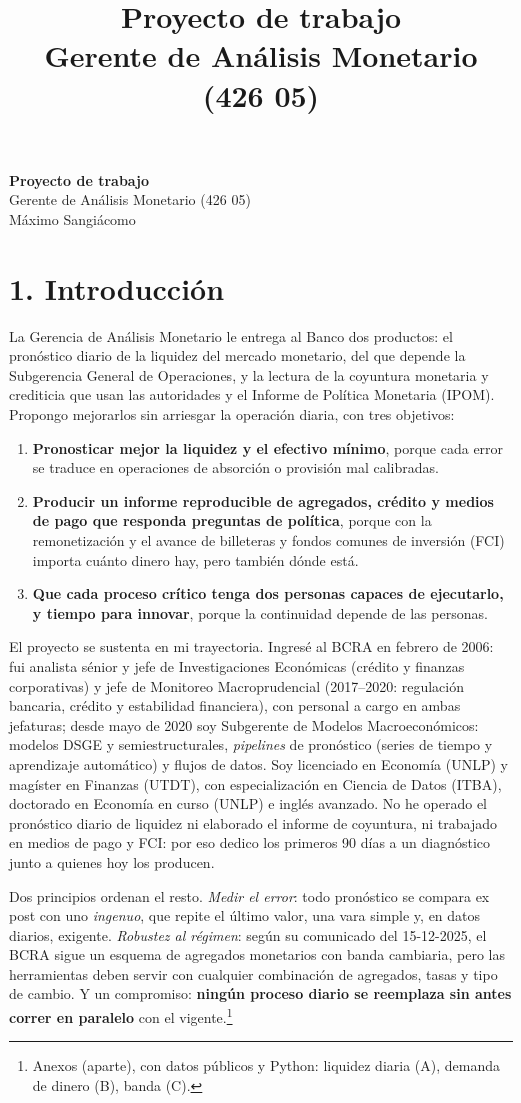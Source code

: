 \documentclass[11pt,a4paper]{article}
\title{\textbf{Proyecto de trabajo}\\[2pt]\large Gerente de Análisis Monetario (426 05)}
\author{\autor}
\date{}
\newcommand{\autor}{Máximo Sangiácomo}
\newcommand{\trayectoria}{Ingresé al BCRA en febrero de 2006: fui analista sénior y jefe de Investigaciones Económicas (crédito y finanzas corporativas) y jefe de Monitoreo Macroprudencial (2017--2020: regulación bancaria, crédito y estabilidad financiera), con personal a cargo en ambas jefaturas; desde mayo de 2020 soy Subgerente de Modelos Macroeconómicos: modelos DSGE y semiestructurales, \emph{pipelines} de pronóstico (series de tiempo y aprendizaje automático) y flujos de datos. Soy licenciado en Economía (UNLP) y magíster en Finanzas (UTDT), con especialización en Ciencia de Datos (ITBA), doctorado en Economía en curso (UNLP) e inglés avanzado.}
\begin{document}
\begin{center}{\Large\textbf{Proyecto de trabajo}}\\[2pt]{\large Gerente de Análisis Monetario (426 05)}\\[4pt]{\large \autor}\end{center}

\section*{1. Introducción}
La Gerencia de Análisis Monetario le entrega al Banco dos productos: el pronóstico diario de la liquidez del mercado monetario, del que depende la Subgerencia General de Operaciones, y la lectura de la coyuntura monetaria y crediticia que usan las autoridades y el Informe de Política Monetaria (IPOM). Propongo mejorarlos sin arriesgar la operación diaria, con tres objetivos:
\begin{enumerate}
\item \textbf{Pronosticar mejor la liquidez y el efectivo mínimo}, porque cada error se traduce en operaciones de absorción o provisión mal calibradas.
\item \textbf{Producir un informe reproducible de agregados, crédito y medios de pago que responda preguntas de política}, porque con la remonetización y el avance de billeteras y fondos comunes de inversión (FCI) importa cuánto dinero hay, pero también dónde está.
\item \textbf{Que cada proceso crítico tenga dos personas capaces de ejecutarlo, y tiempo para innovar}, porque la continuidad depende de las personas.
\end{enumerate}

El proyecto se sustenta en mi trayectoria. \trayectoria{} No he operado el pronóstico diario de liquidez ni elaborado el informe de coyuntura, ni trabajado en medios de pago y FCI: por eso dedico los primeros 90 días a un diagnóstico junto a quienes hoy los producen.

Dos principios ordenan el resto. \emph{Medir el error}: todo pronóstico se compara ex post con uno \emph{ingenuo}, que repite el último valor, una vara simple y, en datos diarios, exigente. \emph{Robustez al régimen}: según su comunicado del 15-12-2025, el BCRA sigue un esquema de agregados monetarios con banda cambiaria, pero las herramientas deben servir con cualquier combinación de agregados, tasas y tipo de cambio. Y un compromiso: \textbf{ningún proceso diario se reemplaza sin antes correr en paralelo} con el vigente.\footnote{Anexos (aparte), con datos públicos y Python: liquidez diaria (A), demanda de dinero (B), banda (C).}
\end{document}
